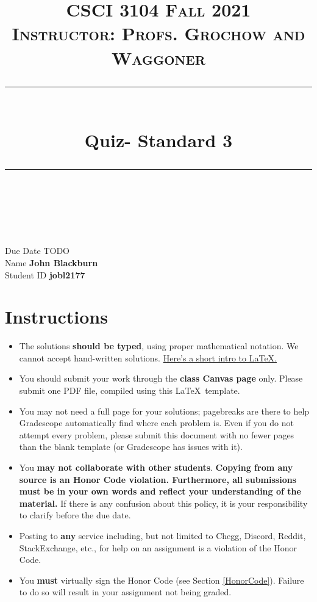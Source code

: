 \documentclass[11pt]{article}
\title{
\normalfont \normalsize 
\textsc{CSCI 3104 Fall 2021 \\ 
Instructor: Profs. Grochow and Waggoner} \\
[10pt] 
\rule{\linewidth}{0.5pt} \\[6pt] 
\huge Quiz- Standard 3 \\
\rule{\linewidth}{2pt}  \\[10pt]
}
\date{}
\theoremstyle{definition}
\theoremstyle{definition}
\theoremstyle{definition}
\begin{document}
\maketitle


\noindent
Due Date \dotfill TODO \\
Name \dotfill \textbf{John Blackburn} \\
Student ID \dotfill \textbf{jobl2177} \\


\tableofcontents

\section{Instructions}
 \begin{itemize}
	\item The solutions \textbf{should be typed}, using proper mathematical notation. We cannot accept hand-written solutions. \href{http://ece.uprm.edu/~caceros/latex/introduction.pdf}{Here's a short intro to \LaTeX.}
	\item You should submit your work through the \textbf{class Canvas page} only. Please submit one PDF file, compiled using this \LaTeX \ template.
	\item You may not need a full page for your solutions; pagebreaks are there to help Gradescope automatically find where each problem is. Even if you do not attempt every problem, please submit this document with no fewer pages than the blank template (or Gradescope has issues with it).

	\item You \textbf{may not collaborate with other students}. \textbf{Copying from any source is an Honor Code violation. Furthermore, all submissions must be in your own words and reflect your understanding of the material.} If there is any confusion about this policy, it is your responsibility to clarify before the due date. 

	\item Posting to \textbf{any} service including, but not limited to Chegg, Discord, Reddit, StackExchange, etc., for help on an assignment is a violation of the Honor Code.

	\item You \textbf{must} virtually sign the Honor Code (see Section \ref{HonorCode}). Failure to do so will result in your assignment not being graded.
\end{itemize}
\end{document}
